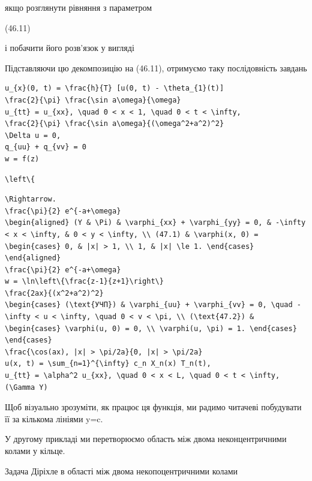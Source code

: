 \documentclass[
  ukrainian,
]{article}
\begin{document}
якщо розглянути рівняння з параметром

(46.11)

і побачити його розв'язок у вигляді

Підставляючи цю декомпозицію на (46.11), отримуємо таку послідовність
завдань

\begin{verbatim}
u_{x}(0, t) = \frac{h}{T} [u(0, t) - \theta_{1}(t)]
\frac{2}{\pi} \frac{\sin a\omega}{\omega}
u_{tt} = u_{xx}, \quad 0 < x < 1, \quad 0 < t < \infty,
\frac{2}{\pi} \frac{\sin a\omega}{(\omega^2+a^2)^2}
\Delta u = 0,
q_{uu} + q_{vv} = 0
w = f(z)
\end{verbatim}

\begin{verbatim}
\left\{
\end{verbatim}

\begin{verbatim}
\Rightarrow.
\frac{\pi}{2} e^{-a+\omega}
\begin{aligned} (Y & \Pi) & \varphi_{xx} + \varphi_{yy} = 0, & -\infty < x < \infty, & 0 < y < \infty, \\ (47.1) & \varphi(x, 0) = \begin{cases} 0, & |x| > 1, \\ 1, & |x| \le 1. \end{cases} \end{aligned}
\frac{\pi}{2} e^{-a+\omega}
w = \ln\left\{\frac{z-1}{z+1}\right\}
\frac{2ax}{(x^2+a^2)^2}
\begin{cases} (\text{УЧП}) & \varphi_{uu} + \varphi_{vv} = 0, \quad -\infty < u < \infty, \quad 0 < v < \pi, \\ (\text{47.2}) & \begin{cases} \varphi(u, 0) = 0, \\ \varphi(u, \pi) = 1. \end{cases} \end{cases}
\frac{\cos(ax), |x| > \pi/2a}{0, |x| > \pi/2a}
u(x, t) = \sum_{n=1}^{\infty} c_n X_n(x) T_n(t),
u_{tt} = \alpha^2 u_{xx}, \quad 0 < x < L, \quad 0 < t < \infty,
(\Gamma Y)
\end{verbatim}

Щоб візуально зрозуміти, як працює ця функція, ми радимо читачеві
побудувати її за кількома лініями y=c.

У другому прикладі ми перетворюємо область між двома неконцентричними
колами у кільце.

Задача Діріхле в області між двома некопоцентричними колами
\end{document}
